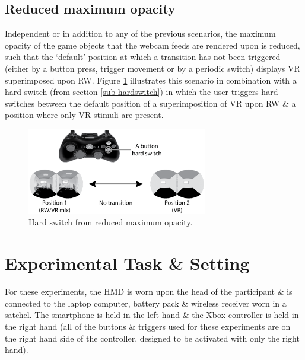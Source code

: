\documentclass[oneside]{book}
\begin{document}
\newpage

\subsection{Reduced maximum opacity}
\label{subsub-baseopacity}
Independent or in addition to any of the previous scenarios, the maximum opacity of the game objects that the webcam feeds are rendered upon is reduced, such that the `default' position at which a transition has not been triggered (either by a button press, trigger movement or by a periodic switch) displays VR superimposed upon RW. Figure \ref{scenariobaseopacity} illustrates this scenario in combination with a hard switch (from section \ref{sub-hardswitch}) in which the user triggers hard switches between the default position of a superimposition of VR upon RW \& a position where only VR stimuli are present.

\begin{figure}[h]
	\begin{center}
		\includegraphics[width=0.7\textwidth]{images/base-opacity-hard-switch.png}
		\caption{Hard switch from reduced maximum opacity.}
		\label{scenariobaseopacity}
	\end{center}
\end{figure}


\section{Experimental Task \& Setting}
For these experiments, the HMD is worn upon the head of the participant \& is connected to the laptop computer, battery pack \& wireless receiver worn in a satchel. The smartphone is held in the left hand \& the Xbox controller is held in the right hand (all of the buttons \& triggers used for these experiments are on the right hand side of the controller, designed to be activated with only the right hand).
\end{document}

